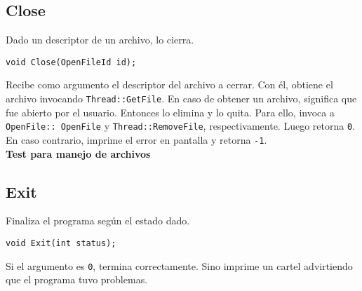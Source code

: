 \subsection*{Close}
Dado un descriptor de un archivo, lo cierra.
\begin{lstlisting}[style=C]
void Close(OpenFileId id);
\end{lstlisting}
Recibe como argumento el descriptor del archivo a cerrar. Con él, obtiene el archivo invocando \texttt{Thread::GetFile}. En caso de obtener un archivo, significa que fue abierto por el usuario. Entonces lo elimina y lo quita. Para ello, invoca a \texttt{OpenFile::~OpenFile} y \texttt{Thread::RemoveFile}, respectivamente. Luego retorna \texttt{0}.\\
En caso contrario, imprime el error en pantalla y retorna \texttt{-1}.\\
\textbf{Test para manejo de archivos}\\
\subsection*{Exit}
Finaliza el programa según el estado dado.
\begin{lstlisting}[style=C]
void Exit(int status);
\end{lstlisting}
Si el argumento es \texttt{0}, termina correctamente. Sino imprime un cartel advirtiendo que el programa tuvo problemas.
